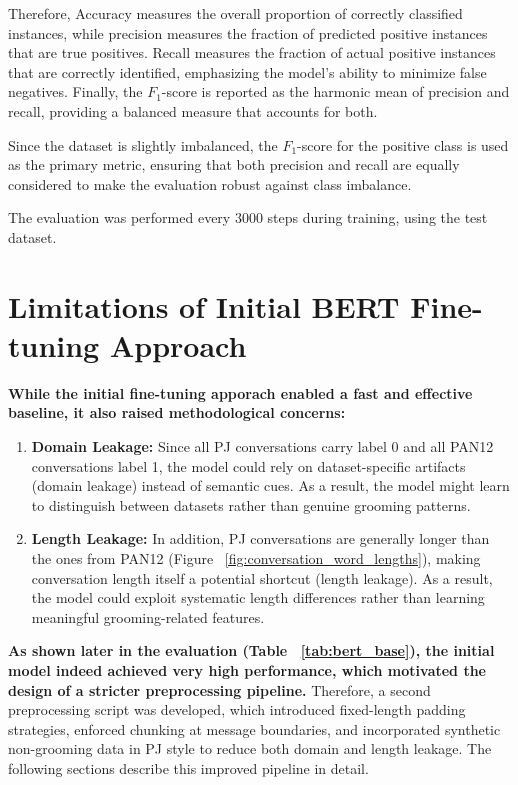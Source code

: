 Therefore, Accuracy measures the overall proportion of correctly classified instances, while precision measures the fraction of predicted positive instances that are true positives. 
Recall measures the fraction of actual positive instances that are correctly identified, emphasizing the model's ability to minimize false negatives. 
Finally, the $F_{1}$-score is reported as the harmonic mean of precision and recall, providing a balanced measure that accounts for both. 

Since the dataset is slightly imbalanced, the $F_{1}$-score for the positive class is used as the primary metric, ensuring that both precision and recall are equally considered to make the evaluation robust against class imbalance.

The evaluation was performed every 3000 steps during training, using the test dataset.

\section{Limitations of Initial BERT Fine-tuning Approach}

\textbf{While the initial fine-tuning apporach enabled a fast and effective baseline, it also raised methodological concerns:}
\begin{enumerate}
  \item \textbf{Domain Leakage:} Since all PJ conversations carry label 0 and all PAN12 conversations label 1, the model could rely on dataset-specific artifacts (domain leakage) instead of semantic cues. As a result, the model might learn to distinguish between datasets rather than genuine grooming patterns.
  \item \textbf{Length Leakage:} In addition, PJ conversations are generally longer than the ones from PAN12 (Figure ~\ref{fig:conversation_word_lengths}), making conversation length itself a potential shortcut (length leakage). As a result, the model could exploit systematic length differences rather than learning meaningful grooming-related features.
\end{enumerate}

\textbf{As shown later in the evaluation (Table ~\ref{tab:bert_base}), the initial model indeed achieved very high performance, which motivated the design of a stricter preprocessing pipeline.} Therefore, a second preprocessing script was developed, which introduced fixed-length padding strategies, enforced chunking at message boundaries, and incorporated synthetic non-grooming data in PJ style to reduce both domain and length leakage. The following sections describe this improved pipeline in detail.

